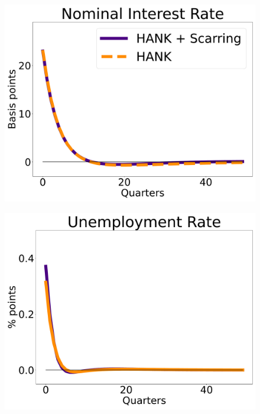 \begin{figure}[htb]
    \centering %
\begin{minipage}{0.33\textwidth}
  \includegraphics[scale=.14]{text/Chapter1/Figures/IPRs_ev/i_IPR_ev}
  \label{fig:1}
\end{minipage}\hfil %
\begin{minipage}{0.33\textwidth}
  \includegraphics[scale=.14]{text/Chapter1/Figures/IPRs_ev/U_IPR_ev}
  \label{fig:2}
\end{minipage}\hfil %
\begin{minipage}{0.33\textwidth}

\end{minipage}
\end{figure}
